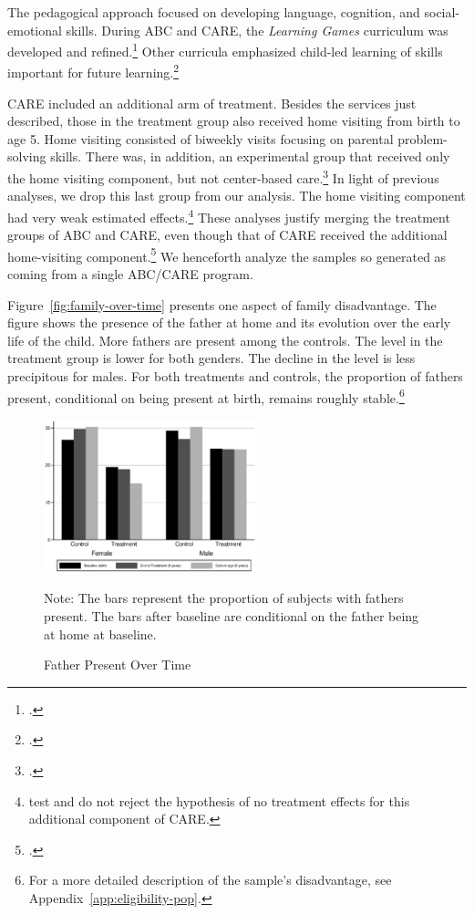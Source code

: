 The pedagogical approach focused on developing language, cognition, and social-emotional skills. During ABC and CARE, the \textit{Learning Games} curriculum was developed and refined.\footnote{\citet{Sparling_Lewis_1979_BOOKLearninggamesFirstThree}.} Other curricula emphasized child-led learning of skills important for future learning.\footnote{\citet{Conti_etal_2016_LongTermHealth}.}

CARE included an additional arm of treatment. Besides the services just described, those in the treatment group also received home visiting from birth to age 5. Home visiting consisted of biweekly visits focusing on parental problem-solving skills. There was, in addition, an experimental group that received only the home visiting component, but not center-based care.\footnote{\citet{Wasik_Ramey_etal_1990_CD}.} In light of previous analyses, we drop this last group from our analysis. The home visiting component had very weak estimated effects.\footnote{\citet{Campbell_Conti_etal_2014_EarlyChildhoodInvestments} test and do not reject the hypothesis of no treatment effects for this additional component of CARE.} These analyses justify merging the treatment groups of ABC and CARE, even though that of CARE received the additional home-visiting component.\footnote{\citet{ABCCARE_Dataset}.} We henceforth analyze the samples so generated as coming from a single ABC/CARE program.

Figure~\ref{fig:family-over-time} presents one aspect of family disadvantage.  The figure shows the presence of the father at home and its evolution over the early life of the child. More fathers are present among the controls. The level in the treatment group is lower for both genders. The decline in the level is less precipitous for males. For both treatments and controls, the proportion of fathers present, conditional on being present at birth, remains roughly stable.\footnote{For a more detailed description of the sample's disadvantage, see Appendix~\ref{app:eligibility-pop}.}

\begin{figure}[H]
\begin{center}
\caption{Father Present Over Time}
\label{fig:family-over-time}
		\label{fig:fhome}
			\includegraphics[width=0.55\textwidth]{output/family-fhome}
\end{center}
\footnotesize \justify
Note: The bars represent the proportion of subjects with fathers present. The bars after baseline are conditional on the father being at home at baseline.
\end{figure}

